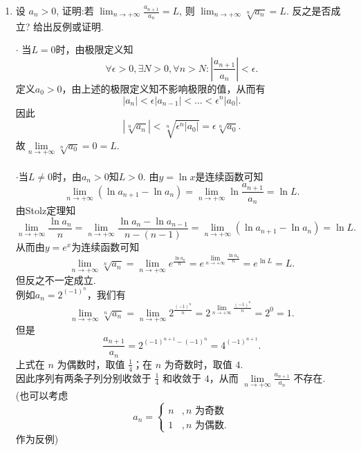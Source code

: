 \begin{enumerate}
    \item[1.]设 $a_{n} > 0$, 证明:若 $\displaystyle \lim_{n\to +\infty}{
    \frac{a_{n + 1}}{a_{n}}} = L$, 则 $\displaystyle \lim_{n\to +\infty}{\sqrt[n]{a_{n}}} = L$.
    反之是否成立? 给出反例或证明.
    \begin{solution}
        $\cdot$ 当$L=0$时，由极限定义知
        \[
        \forall \epsilon>0, \exists N>0, \forall n>N: \left|\frac{a_{n+1}}{a_{n}}\right|<\epsilon.
        \]
        定义$a_{0}>0$，由上述的极限定义知不影响极限的值，从而有
        \[
        \left|a_{n}\right|<\epsilon \left|a_{n-1}\right|<...<\epsilon^n\left|a_{0}\right|.
        \]
        因此
        \[
        \left|\sqrt[n]{a_{n}}\right|<\sqrt[n]{\epsilon^n\left|a_{0}\right|}=\epsilon\sqrt[n]{a_{0}}.
        \]
        故$\underset{n \to +\infty}{\lim}\sqrt[n]{a_{0}}=0=L.$\\ \\
        $\cdot$当$L\neq 0$时，由$a_{n}>0$知$L>0$.
        由$y=\ln{x}$是连续函数可知
        \[
        \lim_{n\rightarrow + \infty}(\ln{a_{n+1}}-\ln{a_{n}})=\lim_{n\rightarrow + \infty}\ln\frac{a_{n+1}}{a_{n}}=\ln{L}.
        \]
        由Stolz定理知
        \[
        \lim_{n \to +\infty}\frac{\ln{a_{n}}}{n}
        =\lim_{n \to +\infty}\frac{\ln{a_{n}-\ln{a_{n-1}}}}{n-(n-1)}
        =\lim_{n\rightarrow + \infty}(\ln{a_{n+1}}-\ln{a_{n}})=\ln{L}.
        \]
        从而由$y=e^x$为连续函数可知
        \[
        \lim_{n \to +\infty}{\sqrt[n]{a_{n}}}=\lim_{n \to +\infty}e^{\frac{\ln{a_{n}}}{n}}=e^{\underset{n\to+\infty}{\lim}\frac{\ln{a_{n}}}{n}}=e^{\ln L}=L.
        \]
        但反之不一定成立.\\
        例如$a_{n}=2^{(-1)^n}$，我们有
        \[
        \lim_{n \to +\infty}{\sqrt[n]{a_{n}}}=\lim_{n \to +\infty}2^{\frac{(-1)^n}{n}}=2^{\underset{n\to+\infty}{\lim}{\frac{(-1)^n}{n}}}=2^0=1.
        \]
        但是
        \[
        \frac{a_{n+1}}{a_{n}}=2^{(-1)^{n+1}-(-1)^n}=4^{(-1)^{n+1}}.
        \]
        上式在 $n$ 为偶数时，取值 $\displaystyle\frac{1}{4}$；在 $n$ 为奇数时，取值 $4$.\\
        因此序列有两条子列分别收敛于 $\displaystyle \frac{1}{4}$ 和收敛于 $4$，从而 $\displaystyle \underset{n\to+\infty}{\lim}\frac{a_{n+1}}{a_{n}}$ 不存在.\\
        (也可以考虑 
        \[
        a_n=
            \begin{cases}
                n &, n \text{ 为奇数}\\
                1 &, n \text{ 为偶数}.
            \end{cases}
        \]
        作为反例)
    \end{solution}


\end{enumerate}
